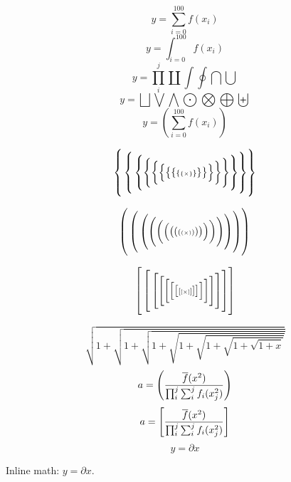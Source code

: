 \def\frac#1#2{{\begingroup#1\endgroup\over{#2}}}

$$y = \sum_{i=0}^{100} f(x_i)$$
$$y = \int_{i=0}^{100} f(x_i)$$
$$y = \prod_i^j \coprod \int \oint \bigcap \bigcup$$
$$y = \bigsqcup \bigvee \bigwedge \bigodot \bigotimes \bigoplus \biguplus$$
$$y = \left( \sum_{i=0}^{100} f(x_i) \right)$$

$$\left\{\vbox to 27pt{}\left\{\vbox to 24pt{}\left\{\vbox to 21pt{} \Biggl\{\biggl\{\Bigl\{\bigl\{\{{\scriptstyle\{{\scriptscriptstyle\{\times\}}\}}\}\bigr\}\Bigr\}\biggr\}\Biggr\}\right\}\right\}\right\}$$

$$\left(\vbox to 27pt{}\left(\vbox to 24pt{}\left(\vbox to 21pt{}\Biggl(\biggl(\Bigl(\bigl(({\scriptstyle({\scriptscriptstyle(\times)})})\bigr)\Bigr)\biggr)\Biggr)\right)\right)\right)$$

$$\left[\vbox to 27pt{}\left[\vbox to 24pt{}\left[\vbox to 21pt{}\Biggl[\biggl[\Bigl[\bigl[{\scriptstyle[{\scriptscriptstyle[\times]}]}]\bigr]\Bigr]\biggr]\Biggr]\right]\right]\right]$$

$$\sqrt{1+\sqrt{1+\sqrt{1+\sqrt{1+\sqrt{1+\sqrt{1+\sqrt{1+x}}}}}}}$$
$$a = \left( \frac{\overline{f}(x^2)}{\prod_i^j \sum_i^j f_i(x_j^2)} \right)$$
$$a = \left[ \frac{\overline{f}(x^2)}{\prod_i^j \sum_i^j f_i(x_j^2)} \right]$$
$$y = \partial x$$

Inline math: $y = \partial x$.

\bye
